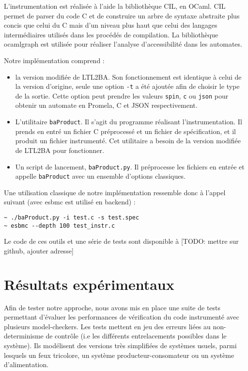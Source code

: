 L'instrumentation est réalisée à l'aide la bibliothèque
CIL\cite{cil}, en OCaml\cite{ocamlrefman}. CIL permet de parser
du code C et de construire un arbre de syntaxe abstraite plus concis que
celui du C mais d'un niveau plus haut que celui des langages
intermédiaires utilisés dans les procédés de compilation. La
bibliothèque ocamlgraph\cite{ocamlgraph} est utilisée pour réaliser
l'analyse d'accessibilité dans les automates.

Notre implémentation comprend :

\begin{itemize}
\item
  la version modifiée de LTL2BA. Son fonctionnement est identique à
  celui de la version d'origine, seule une option \texttt{-t} a été
  ajoutée afin de choisir le type de la sortie. Cette option peut
  prendre les valeurs \texttt{spin}, \texttt{c} ou
  \texttt{json} pour obtenir un automate en Promela, C et JSON
  respectivement.
\item
  L'utilitaire \texttt{baProduct}. Il s'agit du programme réalisant
  l'instrumentation. Il prends en entré un fichier C préprocessé et un
  fichier de spécification, et il produit un fichier instrumenté. Cet
  utilitaire a besoin de la version modifiée de LTL2BA pour fonctionner.
\item
  Un script de lancement, \texttt{baProduct.py}. Il préprocesse les
  fichiers en entrée et appelle \texttt{baProduct} avec un ensemble
  d'options classiques.
\end{itemize}

Une utilisation classique de notre implémentation ressemble donc à
l'appel suivant (avec esbmc\cite{ESBMC} est utilisé en backend) :

\begin{lstlisting}
~ ./baProduct.py -i test.c -s test.spec
~ esbmc --depth 100 test_instr.c
\end{lstlisting}

Le code de ces outils et une série de tests sont disponible à {[}TODO:
mettre sur github, ajouter adresse{]}

\section{Résultats expérimentaux}

Afin de tester notre approche, nous avons mis en place une suite de tests
permettant d'évaluer les performances de vérification du code instrumenté avec
plusieurs model-checkers. Les tests mettent en jeu des erreurs liées au
non-determinisme de contrôle (i.e les différents entrelacements possibles dans
le système). Ils modélisent des versions très simplifiées de systèmes usuels,
parmi lesquels un feux tricolore, un système producteur-consomateur ou un
système d'alimentation.

